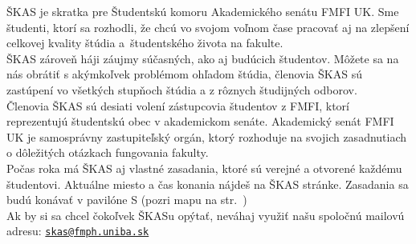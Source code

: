 ŠKAS je skratka pre Študentskú komoru Akademického senátu FMFI UK. Sme študenti, ktorí sa rozhodli, že chcú vo svojom voľnom čase pracovať aj na zlepšení celkovej kvality štúdia a~študentského života na fakulte. \\

ŠKAS zároveň háji záujmy súčasných, ako aj budúcich študentov. Môžete sa na nás obrátiť s akýmkoľvek problémom ohľadom štúdia, členovia ŠKAS sú zastúpení vo všetkých stupňoch štúdia a z rôznych študijných odborov. \\

Členovia ŠKAS sú desiati volení zástupcovia študentov z FMFI, ktorí reprezentujú študentskú obec v akademickom
 senáte. Akademický senát FMFI UK je samosprávny zastupiteľský orgán,
ktorý rozhoduje na svojich zasadnutiach o dôležitých otázkach fungovania fakulty. \\

Počas roka má ŠKAS aj vlastné zasadania, ktoré sú verejné a otvorené každému študentovi. Aktuálne miesto a čas konania nájdeš na ŠKAS stránke. Zasadania sa budú konávať v pavilóne S (pozri mapu na str.\ \pageref{fig:mapa_fmfi}) \\

Ak by si sa chcel čokoľvek ŠKASu opýtať, neváhaj využiť našu spoločnú mailovú adresu: \href{mailto:skas@fmph.uniba.sk}{\texttt{skas@fmph.uniba.sk}} \\




